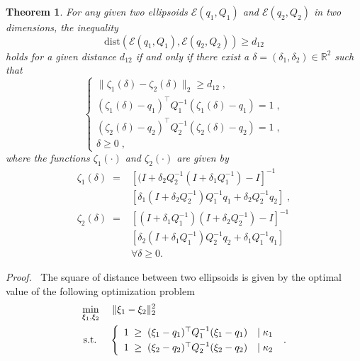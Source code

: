 \documentclass[letterpaper, 10 pt, conference]{ieeeconf}
\newtheorem{theorem}{Theorem}
\begin{document}
\begin{theorem}
	\label{the::ColAvoid}	
	For any given two ellipsoids $\mathcal{E}(q_1,Q_1)$ and $\mathcal{E}(q_2,Q_2)$ in two dimensions, the inequality
	\[
	\text{dist}(\mathcal{E}(q_1,Q_1),\mathcal{E}(q_2,Q_2)) \geq d_{12}
	\]
	holds for a given distance $d_{12}$ if and only if there exist a
	$\delta = (\delta_1, \delta_2)\in\mathbb{R}^{2}$ such that
	\begin{equation}
	\label{eq::constraint_trans}
	\left\{
	\begin{array}{l}
	\|\zeta_1(\delta) - \zeta_2(\delta)\|_2\geq d_\mathrm{12}\;,\\[0.16cm]
	(\zeta_1(\delta)-q_{1})^\top Q_1^{-1} (\zeta_1(\delta)-q_{1})=1\;,\\[0.16cm]
	(\zeta_2(\delta)-q_{2})^\top Q_2^{-1} (\zeta_2(\delta)-q_{2})=1\;,\\[0.16cm]
	\delta \geq 0\;,
	\end{array}
	\right.
	\end{equation}
	where the functions $\zeta_1(\cdot)$ and $\zeta_2(\cdot)$ are given by
	\begin{equation}
	\label{eq::opt2}
	\begin{array}{rl}
	\zeta_1(\delta)\;=&[(I + \delta_2 Q_2^{-1}(I + \delta_1 Q_1^{-1}) - I]^{-1}\\[0.1cm]
	&[\delta_1(I + \delta_2 Q^{-1}_2)Q_1^{-1}q_{1}+\delta_2Q_2^{-1}q_{2}]\;,\\[0.2cm]
	\zeta_2(\delta)\;=&[(I + \delta_1 Q_1^{-1})(I + \delta_2 Q_2^{-1}) - I]^{-1}\\[0.1cm]
	&[\delta_2(I + \delta_1 Q_1^{-1})Q_2^{-1}q_{2}+\delta_1Q_1^{-1}q_{1}]\\[0.1cm]
	&\forall \delta\geq 0.
	\end{array}
	\end{equation}
\end{theorem}
\textit{Proof.}$\;\;$ The square of distance between two ellipsoids is given by the optimal value of the following optimization problem
\begin{align}
\label{eq::dist}
\min_{\xi_1,\xi_2} &\;\quad  \|\xi_1 - \xi_2\|_2^2\\\notag
\text{s.t.}\;&\quad \left\{
\begin{array}{ll}
1\;\geq\; (\xi_1-q_{1})^\top Q_1^{-1} (\xi_1-q_{1})&\mid \kappa_1\\[0.1cm]
1\;\geq\; (\xi_2-q_{2})^\top Q_2^{-1} (\xi_2-q_{2})&\mid \kappa_2
\end{array}
\right.\;.
\end{align}
\end{document}
